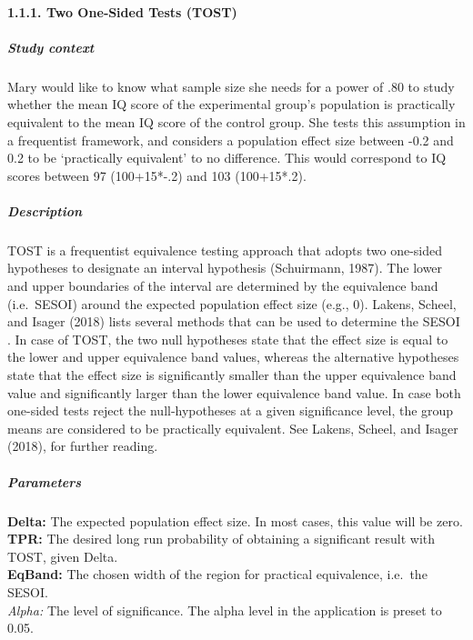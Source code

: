 \documentclass[
  english,
  man,floatsintext]{apa6}
\let\oldparagraph\paragraph
\renewcommand{\paragraph}[1]{\oldparagraph{#1}\mbox{}}
\let\oldsubparagraph\subparagraph
\renewcommand{\subparagraph}[1]{\oldsubparagraph{#1}\mbox{}}
\begin{document}
\hypertarget{two-onesided-tests-tost}{%
\paragraph{1.1.1. Two One‐Sided Tests (TOST)}\label{two-onesided-tests-tost}}

\hypertarget{study-context}{%
\subparagraph{Study context}\label{study-context}}

Mary would like to know what sample size she needs for a power of .80 to study whether the mean IQ score of the experimental group's population is practically equivalent to the mean IQ score of the control group. She tests this assumption in a frequentist framework, and considers a population effect size between -0.2 and 0.2 to be `practically equivalent' to no difference. This would correspond to IQ scores between 97 (100+15*-.2) and 103 (100+15*.2).

\hypertarget{description}{%
\subparagraph{Description}\label{description}}

TOST is a frequentist equivalence testing approach that adopts two one-sided hypotheses to designate an interval hypothesis (Schuirmann, 1987). The lower and upper boundaries of the interval are determined by the equivalence band (i.e.~SESOI) around the expected population effect size (e.g., 0). Lakens, Scheel, and Isager (2018) lists several methods that can be used to determine the SESOI . In case of TOST, the two null hypotheses state that the effect size is equal to the lower and upper equivalence band values, whereas the alternative hypotheses state that the effect size is significantly smaller than the upper equivalence band value and significantly larger than the lower equivalence band value. In case both one-sided tests reject the null-hypotheses at a given significance level, the group means are considered to be practically equivalent. See Lakens, Scheel, and Isager (2018), for further reading.

\hypertarget{parameters}{%
\subparagraph{Parameters}\label{parameters}}

\textbf{Delta:} The expected population effect size. In most cases, this value will be zero.\\
\textbf{TPR:} The desired long run probability of obtaining a significant result with TOST, given Delta.\\
\textbf{EqBand:} The chosen width of the region for practical equivalence, i.e.~the SESOI.\\
\emph{Alpha:} The level of significance. The alpha level in the application is preset to 0.05.\\
\end{document}
